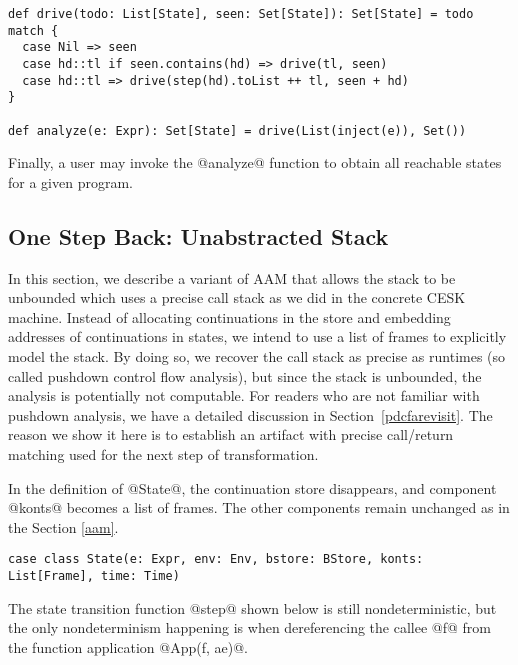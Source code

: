 \documentclass[acmsmall]{acmart}\settopmatter{}
\begin{document}
\begin{lstlisting}
def drive(todo: List[State], seen: Set[State]): Set[State] = todo match {
  case Nil => seen
  case hd::tl if seen.contains(hd) => drive(tl, seen)
  case hd::tl => drive(step(hd).toList ++ tl, seen + hd)
}

def analyze(e: Expr): Set[State] = drive(List(inject(e)), Set())
\end{lstlisting}

Finally, a user may invoke the @analyze@ function to obtain all reachable states for a given
program.


\subsection{One Step Back: Unabstracted Stack} \label{unabs}

In this section, we describe a variant of AAM that allows the stack to be
unbounded which uses a precise call stack as we did in the concrete CESK machine.
Instead of allocating continuations in the store and embedding
addresses of continuations in states, we intend to use a list of frames
to explicitly model the stack.
By doing so, we recover the call stack as precise as runtimes
(so called pushdown control flow analysis), but since
the stack is unbounded, the analysis is potentially not computable.
For readers who are not familiar with pushdown analysis, we have a detailed
discussion in Section~\ref{pdcfarevisit}.
The reason we show it here is to establish an artifact with precise call/return matching
used for the next step of transformation.

In the definition of @State@, the continuation store disappears, and
component @konts@ becomes a list of frames. 
The other components remain unchanged as in the Section \ref{aam}.

\begin{lstlisting}
case class State(e: Expr, env: Env, bstore: BStore, konts: List[Frame], time: Time)
\end{lstlisting}

The state transition function @step@ shown below is still
nondeterministic, but the only nondeterminism happening is when dereferencing the callee @f@
from the function application @App(f, ae)@.
\end{document}
